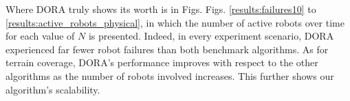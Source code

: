 
Where \ac{DORA} truly shows its worth is in Figs. Figs. \ref{results:failures10} to \ref{results:active_robots_physical}, in which the number of active robots over time for each value of $N$ is presented. Indeed, in every experiment scenario, \ac{DORA} experienced far fewer robot failures than both benchmark algorithms. As for terrain coverage, \ac{DORA}'s performance improves with respect to the other algorithms as the number of robots involved increases. This further shows our algorithm's scalability.

